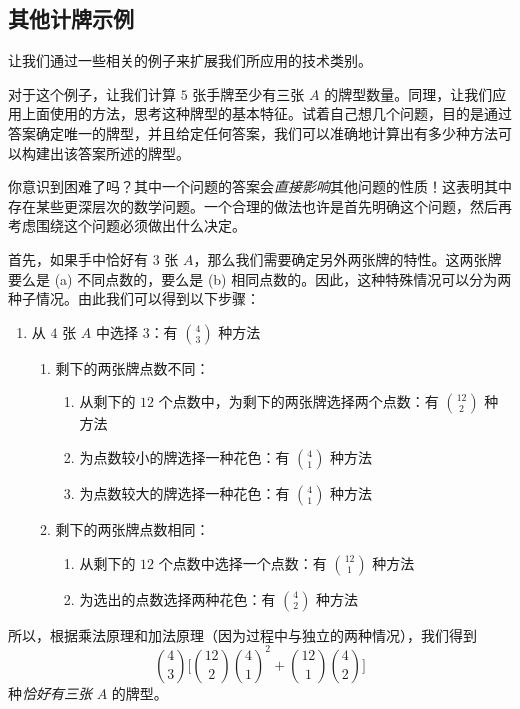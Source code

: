 
\subsection{其他计牌示例}

让我们通过一些相关的例子来扩展我们所应用的技术类别。\\

\begin{example}[至少三张 $A$]

    对于这个例子，让我们计算 $5$ 张手牌至少有三张 $A$ 的牌型数量。同理，让我们应用上面使用的方法，思考这种牌型的基本特征。试着自己想几个问题，目的是通过答案确定唯一的牌型，并且给定任何答案，我们可以准确地计算出有多少种方法可以构建出该答案所述的牌型。

    你意识到困难了吗？其中一个问题的答案会\emph{直接影响}其他问题的性质！这表明其中存在某些更深层次的数学问题。一个合理的做法也许是首先明确这个问题，然后再考虑围绕这个问题必须做出什么决定。

    首先，如果手中恰好有 $3$ 张 $A$，那么我们需要确定另外两张牌的特性。这两张牌要么是 (a) 不同点数的，要么是 (b) 相同点数的。因此，这种特殊情况可以分为两种子情况。由此我们可以得到以下步骤：
    \begin{enumerate}
        \item 从 $4$ 张 $A$ 中选择 $3$：有 ${4 \choose 3}$ 种方法
              \begin{enumerate}[label=(\alph*)]
                  \item 剩下的两张牌点数不同：
                        \begin{enumerate}[label=(\roman*)]
                            \item 从剩下的 $12$ 个点数中，为剩下的两张牌选择两个点数：有 ${12 \choose 2}$ 种方法
                            \item 为点数较小的牌选择一种花色：有 ${4 \choose 1}$ 种方法
                            \item 为点数较大的牌选择一种花色：有 ${4 \choose 1}$ 种方法
                        \end{enumerate}
                  \item 剩下的两张牌点数相同：
                        \begin{enumerate}[label=(\roman*)]
                            \item 从剩下的 $12$ 个点数中选择一个点数：有 ${12 \choose 1}$ 种方法
                            \item 为选出的点数选择两种花色：有 ${4 \choose 2}$ 种方法
                        \end{enumerate}
              \end{enumerate}
    \end{enumerate}
    所以，根据乘法原理和加法原理（因为过程中与独立的两种情况），我们得到
    \[{4 \choose 3}\Bigg[{12 \choose 2} {4 \choose 1}^2 + {12 \choose 1} {4 \choose 2}\Bigg]\]
    种\emph{恰好有三张} $A$ 的牌型。\\


\end{example}
